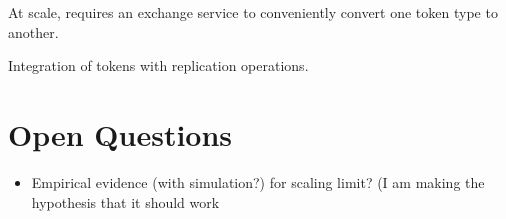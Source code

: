 \documentclass[sigplan,screen,10pt]{acmart}
\begin{document}
At scale, requires an exchange service to conveniently convert one token type to another.

Integration of tokens with replication operations.









\appendix


\section{Open Questions}

\begin{itemize}
\item Empirical evidence (with simulation?) for scaling limit? (I am making the hypothesis that it should work 
\end{itemize}
\end{document}
